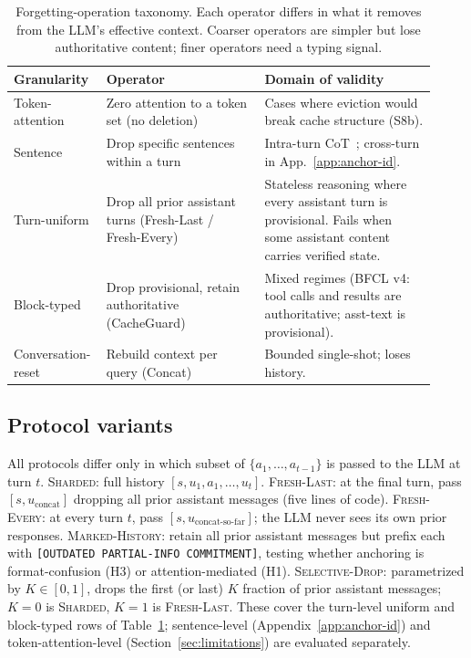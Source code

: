 \documentclass{article}
\begin{document}
\begin{table}[h]
\centering
\caption{Forgetting-operation taxonomy. Each operator differs in what it removes from the LLM's effective context. Coarser operators are simpler but lose authoritative content; finer operators need a typing signal.}
\label{tab:forget-taxonomy}
\small
\setlength{\tabcolsep}{4pt}
\begin{tabular}{p{0.17\linewidth}p{0.36\linewidth}p{0.39\linewidth}}
\toprule
Granularity & Operator & Domain of validity \\
\midrule
Token-attention & Zero attention to a token set (no deletion) & Cases where eviction would break cache structure (S8b). \\
Sentence & Drop specific sentences within a turn & Intra-turn CoT~\citep{thoughtanchors2025}; cross-turn in App.~\ref{app:anchor-id}. \\
Turn-uniform & Drop all prior assistant turns (Fresh-Last / Fresh-Every) & Stateless reasoning where every assistant turn is provisional. Fails when some assistant content carries verified state. \\
Block-typed & Drop provisional, retain authoritative (CacheGuard) & Mixed regimes (BFCL v4: tool calls and results are authoritative; asst-text is provisional). \\
Conversation-reset & Rebuild context per query (Concat) & Bounded single-shot; loses history. \\
\bottomrule
\end{tabular}
\end{table}

\subsection{Protocol variants}
All protocols differ only in which subset of $\{a_1, \ldots, a_{t-1}\}$ is passed to the LLM at turn $t$. \textsc{Sharded}: full history $[s, u_1, a_1, \ldots, u_t]$. \textsc{Fresh-Last}: at the final turn, pass $[s, u_{\text{concat}}]$ dropping all prior assistant messages (five lines of code). \textsc{Fresh-Every}: at every turn $t$, pass $[s, u_{\text{concat-so-far}}]$; the LLM never sees its own prior responses. \textsc{Marked-History}: retain all prior assistant messages but prefix each with \texttt{[OUTDATED PARTIAL-INFO COMMITMENT]}, testing whether anchoring is format-confusion (H3) or attention-mediated (H1). \textsc{Selective-Drop}: parametrized by $K \in [0,1]$, drops the first (or last) $K$ fraction of prior assistant messages; $K=0$ is \textsc{Sharded}, $K=1$ is \textsc{Fresh-Last}. These cover the turn-level uniform and block-typed rows of Table~\ref{tab:forget-taxonomy}; sentence-level (Appendix~\ref{app:anchor-id}) and token-attention-level (Section~\ref{sec:limitations}) are evaluated separately.
\end{document}

